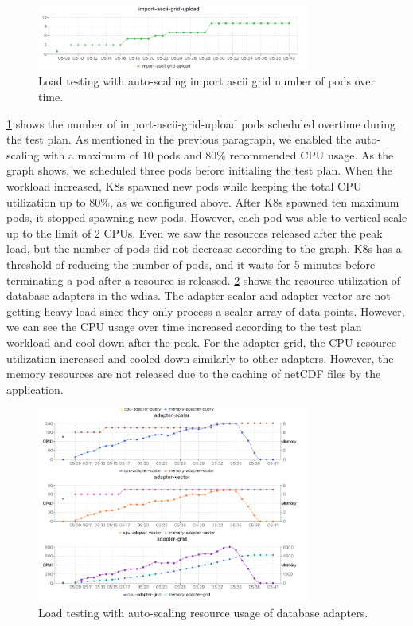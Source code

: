 \begin{figure}[htp]
    \centering
    \includegraphics[width=0.8\textwidth]{results/obs/all_auto/obs_all_auto_15m_import_grid_pod.png}
    \caption{Load testing with auto-scaling import ascii grid number of pods over time.}
    \label{fi:obs_all_auto_15m_import_grid_pod}
\end{figure}

\cref{fi:obs_all_auto_15m_import_grid_pod} shows the number of import-ascii-grid-upload pods scheduled overtime during the test plan. As mentioned in the previous paragraph, we enabled the auto-scaling with a maximum of 10 pods and 80\% recommended CPU usage. As the graph shows, we scheduled three pods before initialing the test plan. When the workload increased, K8s spawned new pods while keeping the total CPU utilization up to 80\%, as we configured above. After K8s spawned ten maximum pods, it stopped spawning new pods. However, each pod was able to vertical scale up to the limit of 2 CPUs. Even we saw the resources released after the peak load, but the number of pods did not decrease according to the graph. K8s has a threshold of reducing the number of pods, and it waits for 5 minutes before terminating a pod after a resource is released. \cref{fi:obs_all_auto_15m_adapter_dbs_res} shows the resource utilization of database adapters in the \acrshort{wdias}. The adapter-scalar and adapter-vector are not getting heavy load since they only process a scalar array of data points. However, we can see the CPU usage over time increased according to the test plan workload and cool down after the peak. For the adapter-grid, the CPU resource utilization increased and cooled down similarly to other adapters. However, the memory resources are not released due to the caching of netCDF files by the application.

\begin{figure}[htp]
    \centering
    \includegraphics[width=0.8\textwidth]{results/obs/all_auto/obs_all_auto_15m_adapter_dbs_res.png}
    \caption{Load testing with auto-scaling resource usage of database adapters.}
    \label{fi:obs_all_auto_15m_adapter_dbs_res}
\end{figure}


